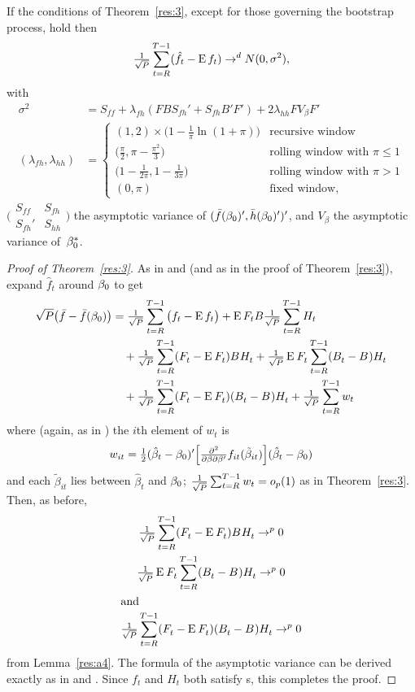\documentclass[12pt,fleqn]{article}
\begin{document}
\begin{lema}\label{res:a5}
  If the conditions of Theorem~\ref{res:3}, except for those governing
  the bootstrap process, hold then
  \begin{equation}
    \tfrac{1}{\sqrt{P}} \sum_{t=R}^{T-1}
    (\hat f_t - \operatorname{E} f_t) \to^d N(0, \sigma^2),
  \end{equation}
  with
  \begin{align}
  \sigma^2 &= S_{ff} + \lambda_{fh} (F B S_{fh}' + S_{fh} B' F') + 2 \lambda_{hh} F V_\beta F' \\
  (\lambda_{fh}, \lambda_{hh}) &=
  \begin{cases}
    (1, 2) \times \big(1 - \tfrac{1}{\pi} \ln(1 + \pi)\big)
      & \text{recursive window} \\
    \big(\tfrac{\pi}{2}, \pi - \tfrac{\pi^2}{3}\big)
      & \text{rolling window with $\pi \leq 1$} \\
    \big(1 - \tfrac{1}{2\pi}, 1 - \tfrac{1}{3\pi}\big)
      & \text{rolling window with $\pi > 1$} \\
    (0, \pi) & \text{fixed window},
  \end{cases}
  \end{align}
  $\Big(\begin{smallmatrix}S_{ff} & S_{fh} \\ S_{fh}' &
    S_{hh} \end{smallmatrix} \Big)$ the asymptotic variance of $(\bar
  f(\beta_0)', \bar h(\beta_0)')'$, and $V_\beta$ the asymptotic
  variance of~$\beta_0^*$.
\end{lema}

\begin{proof}[Proof of Theorem~\ref{res:3}]
  As in \citet{Wes:96} and \citet{WeM:98} (and as in the proof of
  Theorem~\ref{res:3}), expand $\hat f_t$ around
  $\beta_0$ to get
  \begin{align*}
    \sqrt{P} \big(\bar{f} - \bar{f}(\beta_0)\big) &= \tfrac{1}{\sqrt{P}} \sum_{t=R}^{T-1}
    \big(f_t - \operatorname{E} f_t\big) +
    \operatorname{E} F_t B \tfrac{1}{\sqrt{P}} \sum_{t=R}^{T-1} H_t \\
    & \quad + \tfrac{1}{\sqrt{P}} \sum_{t=R}^{T-1} (F_t^{} - \operatorname{E}^{} F_t^{}) B^{} H_t^{} + \tfrac{1}{\sqrt{P}} \operatorname{E}^{} F_t^{} \sum_{t=R}^{T-1} (B_t^{} - B^{}) H_t^{} \\ & \quad + \tfrac{1}{\sqrt{P}} \sum_{t=R}^{T-1} (F_t^{} - \operatorname{E}^{} F_t^{}) (B_t^{} - B^{}) H_t^{} + \tfrac{1}{\sqrt{P}} \sum_{t=R}^{T-1} w_t
  \end{align*}
  where (again, as in \citealp{Wes:96}) the $i$th element of $w_t$ is
  \begin{equation*}
    w_{it} = \tfrac12 (\hat\beta_t - \beta_0)'
    \Big[\tfrac{\partial^2}{\partial \beta \partial\beta'}
    f_{it}(\tilde\beta_{it}) \Big]
    (\hat\beta_t - \beta_0)
  \end{equation*}
  and each $\tilde\beta_{it}$ lies between $\hat\beta_t$ and
  $\beta_0$; $\tfrac{1}{\sqrt{P}} \sum_{t=R}^{T-1} w_t = o_{p}(1)$ as in Theorem~\ref{res:3}.
  Then, as before,
  \begin{gather}
    \tfrac{1}{\sqrt{P}} \sum_{t=R}^{T-1} (F_t^{} - \operatorname{E}^{} F_t^{}) B^{} H_t^{} \to^{p} 0 \label{eq:11} \\
    \tfrac{1}{\sqrt{P}} \operatorname{E}^{} F_t^{} \sum_{t=R}^{T-1} (B_t^{} - B^{}) H_t^{} \to^{p} 0 \label{eq:12}\\
  \intertext{and}
    \tfrac{1}{\sqrt{P}} \sum_{t=R}^{T-1} (F_t^{} - \operatorname{E}^{} F_t^{}) (B_t^{} - B^{}) H_t^{} \to^{p} 0 \label{eq:13}
  \end{gather}
  from Lemma~\ref{res:a4}.  The formula of the asymptotic variance can
  be derived exactly as in \citet{Wes:96} and \citet{WeM:98}. Since
  $f_t$ and $H_t$ both satisfy \clt s, this completes the
  proof.
\end{proof}


\end{document}
